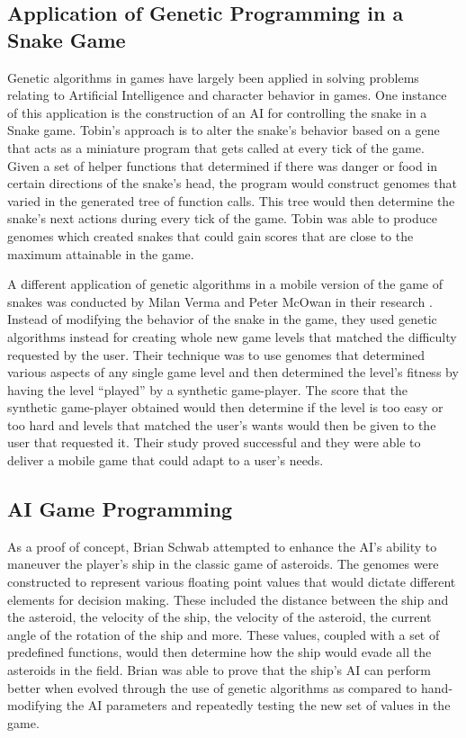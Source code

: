 \subsection{Application of Genetic Programming in a Snake Game}
Genetic algorithms in games have largely been applied in solving problems relating to
Artificial Intelligence and character behavior in games. One instance of this application
is the construction of an AI for controlling the snake in a Snake game\cite{Ehlis00}.
Tobin's approach is to alter the snake's behavior based on a gene that acts as a miniature
program that gets called at every tick of the game. Given a set of helper functions that
determined if there was danger or food in certain directions of the snake's head, the
program would construct genomes that varied in the generated tree of function calls. This
tree would then determine the snake's next actions during every tick of the game. Tobin
was able to produce genomes which created snakes that could gain scores that are close to
the maximum attainable in the game.  


A different application of genetic algorithms in a mobile version of the game of snakes
was conducted by Milan Verma and Peter McOwan in their research \cite{Verma05}. Instead
of modifying the behavior of the snake in the game, they used genetic algorithms instead
for creating whole new game levels that matched the difficulty requested by the user.
Their technique was to use genomes that determined various aspects of any single game
level and then determined the level's fitness by having the level “played” by a synthetic
game-player. The score that the synthetic game-player obtained would then determine if
the level is too easy or too hard and levels that matched the user's wants would then be
given to the user that requested it. Their study proved successful and they were able to
deliver a mobile game that could adapt to a user's needs.

\subsection{AI Game Programming}
As a proof of concept, Brian Schwab attempted to enhance the AI's ability to maneuver
the player's ship in the classic game of asteroids\cite{Schwab04}. The genomes were
constructed to represent various floating point values that would dictate different
elements for decision making. These included the distance between the ship and the asteroid,
the velocity of the ship, the velocity of the asteroid, the current angle of the rotation
of the ship and more. These values, coupled with a set of predefined functions, would then
determine how the ship would evade all the asteroids in the field. Brian was able to prove
that the ship's AI can perform better when evolved through the use of genetic algorithms as
compared to hand-modifying the AI parameters and repeatedly testing the new set of values in
the game.

